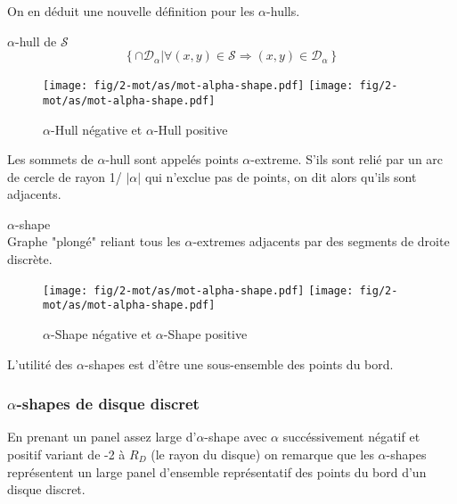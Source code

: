 On en déduit une nouvelle définition pour les $\alpha$-hulls.

\begin{Definition}{$\alpha$-hull de $\mathcal{S}$}
\label{def:ah}
    $$\left\{ \cap \mathcal{D}_{\alpha} | \forall (x,y)\in \mathcal{S} \Rightarrow (x,y) \in \mathcal{D}_{\alpha} \right\}$$
\end{Definition}

\begin{figure}[h!]
  \centering
  \texttt{[image: fig/2-mot/as/mot-alpha-shape.pdf]}
  \texttt{[image: fig/2-mot/as/mot-alpha-shape.pdf]}
  \caption{$\alpha$-Hull négative et $\alpha$-Hull positive }
\end{figure}

       

Les sommets de $\alpha$-hull sont appelés points $\alpha$-extreme. S'ils sont relié par un arc de cercle de rayon 1/ $\lvert \alpha \rvert$ qui n'exclue pas de points, on dit alors qu'ils sont adjacents.

\begin{Definition}{$\alpha$-shape}\\
\label{def:as}
      Graphe "plongé" reliant tous les $\alpha$-extremes adjacents par des segments de droite discrète.
\end{Definition}

\begin{figure}[h!]
  \centering
  \texttt{[image: fig/2-mot/as/mot-alpha-shape.pdf]}
  \texttt{[image: fig/2-mot/as/mot-alpha-shape.pdf]}
  \caption{$\alpha$-Shape négative et $\alpha$-Shape positive }
\end{figure}

L'utilité des $\alpha$-shapes est d'être une sous-ensemble des points du bord. 

\subsubsection{$\alpha$-shapes de disque discret}

En prenant un panel assez large d'$\alpha$-shape avec $\alpha$ succéssivement négatif et positif variant de -2 à $R_D$ (le rayon du disque) on remarque que les $\alpha$-shapes représentent un large panel d'ensemble représentatif des points du bord d'un disque discret.

